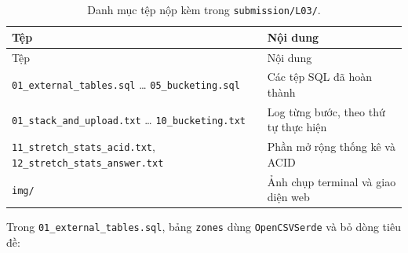 \documentclass[
  12pt,
  a4paper,
]{report}
\begin{document}
\begin{longtable}[]{@{}
  >{\raggedright\arraybackslash}p{}
  >{\raggedright\arraybackslash}p{}@{}}
\caption{\label{tbl:l03-files}Danh mục tệp nộp kèm trong
\texttt{submission/L03/}.}\tabularnewline
\toprule\noalign{}
\begin{minipage}[b]{\linewidth}\raggedright
Tệp
\end{minipage} & \begin{minipage}[b]{\linewidth}\raggedright
Nội dung
\end{minipage} \\
\midrule\noalign{}
\endfirsthead
\toprule\noalign{}
\begin{minipage}[b]{\linewidth}\raggedright
Tệp
\end{minipage} & \begin{minipage}[b]{\linewidth}\raggedright
Nội dung
\end{minipage} \\
\midrule\noalign{}
\endhead
\bottomrule\noalign{}
\endlastfoot
\texttt{01\_}\allowbreak{}\texttt{external\_}\allowbreak{}\texttt{tables.}\allowbreak{}\texttt{sql}\allowbreak{}
\ldots{}
\texttt{05\_}\allowbreak{}\texttt{bucketing.}\allowbreak{}\texttt{sql}\allowbreak{}
& Các tệp SQL đã hoàn thành \\
\texttt{01\_}\allowbreak{}\texttt{stack\_}\allowbreak{}\texttt{and\_}\allowbreak{}\texttt{upload.}\allowbreak{}\texttt{txt}\allowbreak{}
\ldots{}
\texttt{10\_}\allowbreak{}\texttt{bucketing.}\allowbreak{}\texttt{txt}\allowbreak{}
& Log từng bước, theo thứ tự thực hiện \\
\texttt{11\_}\allowbreak{}\texttt{stretch\_}\allowbreak{}\texttt{stats\_}\allowbreak{}\texttt{acid.}\allowbreak{}\texttt{txt}\allowbreak{},
\texttt{12\_}\allowbreak{}\texttt{stretch\_}\allowbreak{}\texttt{stats\_}\allowbreak{}\texttt{answer.}\allowbreak{}\texttt{txt}\allowbreak{}
& Phần mở rộng thống kê và ACID \\
\texttt{img/} & Ảnh chụp terminal và giao diện web \\
\end{longtable}

Trong
\texttt{01\_}\allowbreak{}\texttt{external\_}\allowbreak{}\texttt{tables.}\allowbreak{}\texttt{sql}\allowbreak{},
bảng \texttt{zones} dùng \texttt{OpenCSVSerde} và bỏ dòng tiêu đề:
\end{document}

